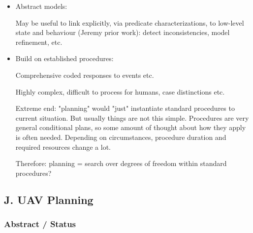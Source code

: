\begin{itemize}

\item Abstract models:

    May be useful to link explicitly, via predicate characterizations,
    to low-level state and behaviour (Jeremy prior work): detect
    inconsistencies, model refinement, etc.
 
\item Build on established procedures:

    Comprehensive coded responses to events etc.
    
    Highly complex, difficult to process for humans, case distinctions
    etc.
    
    Extreme end: "planning" would "just" instantiate standard
    procedures to current situation. But usually things are not this
    simple.  Procedures are very general conditional plans, so some
    amount of thought about how they apply is often needed.  Depending
    on circumstances, procedure duration and required resources change
    a lot.
    
    Therefore: planning = search over degrees of freedom within
    standard procedures?
    
\end{itemize}



















\subsection{J. UAV Planning}


\subsubsection{Abstract / Status}

